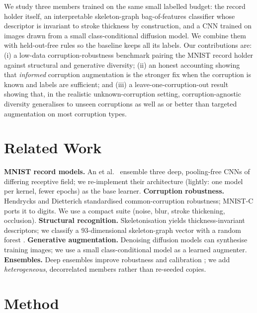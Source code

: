 \documentclass{article}
\begin{document}
We study three members trained on the same small labelled budget: the record holder itself,
an interpretable skeleton-graph bag-of-features classifier whose descriptor is invariant to
stroke thickness by construction, and a CNN trained on images drawn from a small
class-conditional diffusion model. We combine them with held-out-free rules so the baseline
keeps all its labels. Our contributions are: (i) a low-data corruption-robustness benchmark
pairing the MNIST record holder against structural and generative diversity; (ii) an honest
accounting showing that \emph{informed} corruption augmentation is the stronger fix when the
corruption is known and labels are sufficient; and (iii) a leave-one-corruption-out result
showing that, in the realistic unknown-corruption setting, corruption-agnostic diversity
generalises to unseen corruptions as well as or better than targeted augmentation on most
corruption types.

\section{Related Work}
\textbf{MNIST record models.} An et al.\ \cite{An2020} ensemble three deep, pooling-free CNNs
of differing receptive field; we re-implement their architecture (lightly: one model per
kernel, fewer epochs) as the base learner. \textbf{Corruption robustness.} Hendrycks and
Dietterich \cite{Hendrycks2019} standardised common-corruption robustness; MNIST-C
\cite{Mu2019} ports it to digits. We use a compact suite (noise, blur, stroke thickening,
occlusion). \textbf{Structural recognition.} Skeletonisation \cite{GuoHall1989} yields
thickness-invariant descriptors; we classify a $93$-dimensional skeleton-graph vector with a
random forest \cite{Breiman2001}. \textbf{Generative augmentation.} Denoising diffusion models
\cite{Ho2020,Song2021} can synthesise training images; we use a small class-conditional model
as a learned augmenter. \textbf{Ensembles.} Deep ensembles improve robustness and calibration
\cite{Lakshminarayanan2017}; we add \emph{heterogeneous}, decorrelated members rather than
re-seeded copies.

\section{Method}
\end{document}
